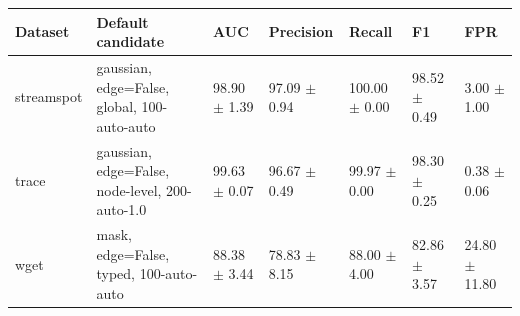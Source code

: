 \begin{tabular}{lllllll}
\toprule
Dataset & Default candidate & AUC & Precision & Recall & F1 & FPR \\
\midrule
streamspot & gaussian, edge=False, global, 100-auto-auto & 98.90 $\pm$ 1.39 & 97.09 $\pm$ 0.94 & 100.00 $\pm$ 0.00 & 98.52 $\pm$ 0.49 & 3.00 $\pm$ 1.00 \\
trace & gaussian, edge=False, node-level, 200-auto-1.0 & 99.63 $\pm$ 0.07 & 96.67 $\pm$ 0.49 & 99.97 $\pm$ 0.00 & 98.30 $\pm$ 0.25 & 0.38 $\pm$ 0.06 \\
wget & mask, edge=False, typed, 100-auto-auto & 88.38 $\pm$ 3.44 & 78.83 $\pm$ 8.15 & 88.00 $\pm$ 4.00 & 82.86 $\pm$ 3.57 & 24.80 $\pm$ 11.80 \\
\bottomrule
\end{tabular}
